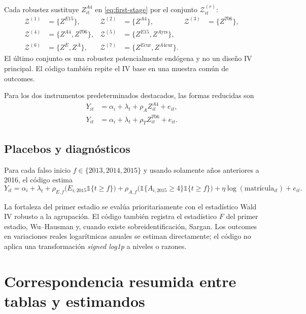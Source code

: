 \documentclass[11pt]{article}
\newcommand{\ind}{\mathbb{1}}
\begin{document}
Cada robustez sustituye $Z^{A4}_{it}$ en
\eqref{eq:first-stage} por el conjunto $\mathcal Z_{it}^{(r)}$:
\begin{align}
 \mathcal Z^{(1)}&=\{Z^{E15}\}, &
 \mathcal Z^{(2)}&=\{Z^{A4}\}, &
 \mathcal Z^{(3)}&=\{Z^{T06}\}, \\
 \mathcal Z^{(4)}&=\{Z^{A4},Z^{T06}\}, &
 \mathcal Z^{(5)}&=\{Z^{E15},Z^{A\mathrm{yrs}}\}, \\
 \mathcal Z^{(6)}&=\{Z^{\bar E},Z^{\bar A}\}, &
 \mathcal Z^{(7)}&=\{Z^{E\mathrm{cur}},Z^{A4\mathrm{cur}}\}.
\end{align}
El último conjunto es una robustez potencialmente endógena y no un diseño IV
principal. El código también repite el IV base en una muestra común de outcomes.

Para los dos instrumentos predeterminados destacados, las formas reducidas son
\begin{align}
 Y_{it}&=\alpha_i+\lambda_t+\rho_A Z^{A4}_{it}+e_{it}, \\
 Y_{it}&=\alpha_i+\lambda_t+\rho_T Z^{T06}_{it}+e_{it}.
\end{align}

\subsection{Placebos y diagnósticos}

Para cada falso inicio $f\in\{2013,2014,2015\}$ y usando solamente años
anteriores a 2016, el código estima
\begin{equation}
 Y_{it}=\alpha_i+\lambda_t
 +\rho_{E,f}\bigl(E_{i,2015}\ind\{t\geq f\}\bigr)
 +\rho_{A,f}\bigl(\ind\{A_{i,2015}\geq4\}\ind\{t\geq f\}\bigr)
 +\eta\log(\text{matrícula}_{it})+e_{it}.
\end{equation}

La fortaleza del primer estadio se evalúa prioritariamente con el estadístico
Wald IV robusto a la agrupación. El código también registra el estadístico $F$
del primer estadio, Wu--Hausman y, cuando existe sobreidentificación, Sargan.
Los outcomes en variaciones reales logarítmicas anuales se estiman directamente;
el código no aplica una transformación \emph{signed log1p} a niveles o razones.

\section{Correspondencia resumida entre tablas y estimandos}
\end{document}
